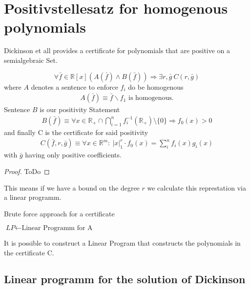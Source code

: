 \documentclass[./main.tex]{subfiles}
\begin{document}
\section{Positivstellesatz for homogenous polynomials}

Dickinson et all provides a certificate for polynomials that are positive on a semialgebraic Set.
\begin{thm}
\label{Dickinson}
\begin{equation}
\forall \bar{f} \in \mathbb{R}[x] \left( A(\bar{f}) \wedge B(\bar{f}) \right) \Rightarrow \exists r, \bar{g} \  C(r,\bar{g})
\end{equation}
where $A$ denotes a sentence to enforce $f_i$ do be homogenous
\begin{align*}
A(\bar{f}) \equiv \bar f \backslash f_1 \text{ is homogenous}.
\end{align*}
Sentence $B$ is our positivity Statement
\begin{align*}
B(\bar f ) \equiv \forall x \in \mathbb{R}_+\cap \bigcap_{i=1}^n f_i^{-1}(\mathbb R_+) \setminus \lbrace 0 \rbrace \Rightarrow f_0(x) >0 
\end{align*}
and finally C is the certificate for said positivity
\begin{align*}
C(\bar f ,r, \bar g) \equiv \forall x \in \mathbb{R}^m : \ \vert x \vert_1^r \cdot f_0(x) = \sum_i^n f_i(x)g_i(x) 
\end{align*}
with $\bar g$ having only positive coefficients.
\begin{proof}
ToDo
\end{proof}
\end{thm}
This means if we have a bound on the degree $r$ we calculate this represtation via a linear programm.

\begin{algorithm}
\caption{Brute force approach for a certificate}\label{euclid}
\begin{algorithmic}[1]
\State $\textit{LP} \gets \text{Linear Programm for A}$\\
 {
}
\end{algorithmic}
\end{algorithm}


It is possible to construct a Linear Program that constructs the polynomials in the certificate C.
\subsection{Linear programm for the solution of Dickinson}
\end{document}
